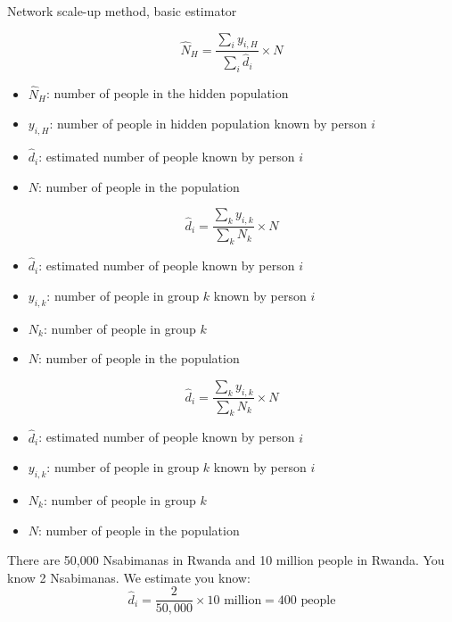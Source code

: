 \documentclass[aspectratio=169]{beamer}
\begin{document}
\begin{frame}

\LARGE{Network scale-up method, basic estimator}

\end{frame}
\begin{frame}

\begin{equation*}
\hat{N}_H = \frac{\sum_i y_{i,H}}{\sum_i \hat{d}_i} \times N
\end{equation*}
\small{
\begin{itemize}
\item $\hat{N}_H$: number of people in the hidden population
\item $y_{i,H}$: number of people in hidden population known by person $i$
\item $\hat{d}_i$: estimated number of people known by person $i$
\item $N$: number of people in the population
\end{itemize}
}

\end{frame}
\begin{frame}

\begin{equation*}
\hat{d}_i =  \frac{\sum_k y_{i,k}}{\sum_k N_k} \times N
\end{equation*}
\small{
\begin{itemize}
\item $\hat{d}_i$: estimated number of people known by person $i$
\item $y_{i,k}$: number of people in group $k$ known by person $i$
\item $N_k$: number of people in group $k$
\item $N$: number of people in the population
\end{itemize}
}

\end{frame}
\begin{frame}

\begin{equation*}
\hat{d}_i = \frac{\sum_k y_{i,k}}{\sum_k N_k} \times N
\end{equation*}
\small{
\begin{itemize}
\item $\hat{d}_i$: estimated number of people known by person $i$
\item $y_{i,k}$: number of people in group $k$ known by person $i$
\item $N_k$: number of people in group $k$
\item $N$: number of people in the population
\end{itemize}
}

There are 50,000 Nsabimanas in Rwanda and 10 million people in Rwanda.  You know 2 Nsabimanas.  We estimate you know:
\pause
\begin{equation*}
\hat{d}_i = \frac{2}{50,000} \times 10 \mbox{ million} = 400 \mbox{ people} 
\end{equation*}

\end{frame}
\end{document}
